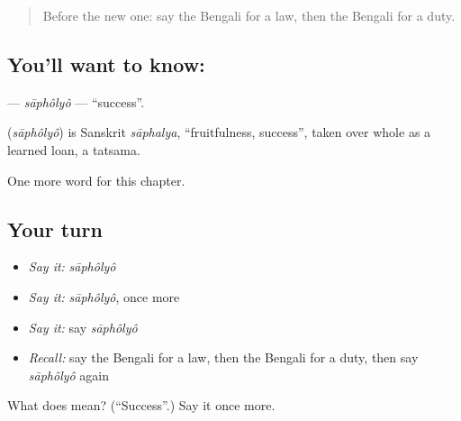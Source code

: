 \label{lesson:BN-C200-sapholyo}



\begin{quote}
Before the new one: say the Bengali for a law, then the Bengali for a duty.
\end{quote}

\subsection*{You'll want to know: }
\textbf{} — \emph{sāphôlyô} — \textquotedblleft{}success\textquotedblright{}.

\begin{cousinweb}
\textbf{} (\emph{sāphôlyô}) is Sanskrit \emph{sāphalya}, \textquotedblleft{}fruitfulness, success\textquotedblright{}, taken over whole as a learned loan, a tatsama.
\end{cousinweb}

\begin{grammarlens}[title={What you've built}]
One more word for this chapter.
\end{grammarlens}

\subsection*{Your turn}
\begin{itemize}
\raggedright
  \item \emph{Say it:} \emph{sāphôlyô}
  \item \emph{Say it:} \emph{sāphôlyô}, once more
  \item \emph{Say it:} say \emph{sāphôlyô}
  \item \emph{Recall:} say the Bengali for a law, then the Bengali for a duty, then say \emph{sāphôlyô} again
\end{itemize}

\begin{tcolorbox}[breakable,colback=teal!4,colframe=teal!35!black,title={Before you move on}]
What does  mean? (\textquotedblleft{}Success\textquotedblright{}.) Say it once more.
\end{tcolorbox}
